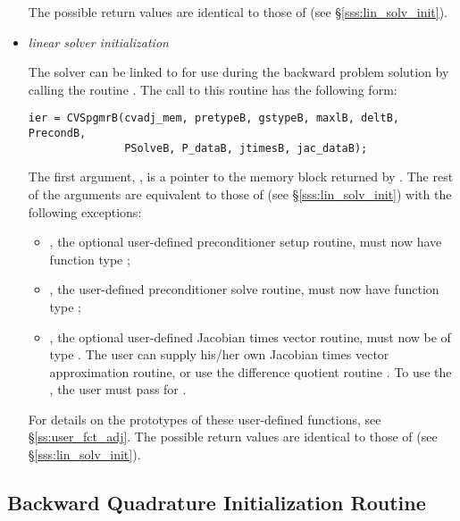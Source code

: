 \begin{itemize}
  The possible return values  are identical to those of 
  (see \S\ref{sss:lin_solv_init}).

\item {\em {\spgmr} linear solver initialization}
  
  The {\cvspgmr} solver can be linked to {\cvodes} for use during the
  backward problem solution by calling the routine . The
  call to this routine has the following form:
\begin{verbatim}
ier = CVSpgmrB(cvadj_mem, pretypeB, gstypeB, maxlB, deltB, PrecondB, 
               PSolveB, P_dataB, jtimesB, jac_dataB);
\end{verbatim}
  The first argument, , is a pointer to the memory block
  returned by . The rest of the arguments are equivalent 
  to those of  (see \S\ref{sss:lin_solv_init}) with the 
  following exceptions:
  \begin{itemize}
  \item {}, the optional user-defined preconditioner setup
    routine, must now have function type ;
  \item {}, the user-defined preconditioner solve routine,
    must now have function type ;
  \item {}, the optional user-defined Jacobian times vector 
    routine, must now be of type . The user can 
    supply his/her own Jacobian times vector approximation routine, 
    or use the difference quotient routine .
    To use the , the user must pass  
    for .
  \end{itemize}
  For details on the prototypes of these user-defined functions, 
  see \S\ref{ss:user_fct_adj}.
  The possible return values  are identical to those of 
  (see \S\ref{sss:lin_solv_init}).


\end{itemize}

\subsection{Backward Quadrature Initialization Routine}\label{sss:cvodequadmallocb}

